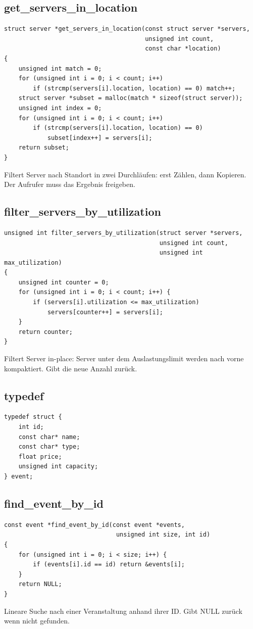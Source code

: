 \documentclass[10pt, a4paper]{article}
\begin{document}
\subsection{get\_servers\_in\_location}
\begin{lstlisting}
struct server *get_servers_in_location(const struct server *servers,
                                       unsigned int count,
                                       const char *location)
{
    unsigned int match = 0;
    for (unsigned int i = 0; i < count; i++)
        if (strcmp(servers[i].location, location) == 0) match++;
    struct server *subset = malloc(match * sizeof(struct server));
    unsigned int index = 0;
    for (unsigned int i = 0; i < count; i++)
        if (strcmp(servers[i].location, location) == 0)
            subset[index++] = servers[i];
    return subset;
}
\end{lstlisting}
Filtert Server nach Standort in zwei Durchl\"aufen: erst Z\"ahlen, dann Kopieren. Der Aufrufer muss das Ergebnis freigeben.

\subsection{filter\_servers\_by\_utilization}
\begin{lstlisting}
unsigned int filter_servers_by_utilization(struct server *servers,
                                           unsigned int count,
                                           unsigned int max_utilization)
{
    unsigned int counter = 0;
    for (unsigned int i = 0; i < count; i++) {
        if (servers[i].utilization <= max_utilization)
            servers[counter++] = servers[i];
    }
    return counter;
}
\end{lstlisting}
Filtert Server in-place: Server unter dem Auslastungslimit werden nach vorne kompaktiert. Gibt die neue Anzahl zur\"uck.

\subsection{typedef}
\begin{lstlisting}
typedef struct {
    int id;
    const char* name;
    const char* type;
    float price;
    unsigned int capacity;
} event;
\end{lstlisting}

\subsection{find\_event\_by\_id}
\begin{lstlisting}
const event *find_event_by_id(const event *events,
                               unsigned int size, int id)
{
    for (unsigned int i = 0; i < size; i++) {
        if (events[i].id == id) return &events[i];
    }
    return NULL;
}
\end{lstlisting}
Lineare Suche nach einer Veranstaltung anhand ihrer ID. Gibt NULL zur\"uck wenn nicht gefunden.
\end{document}
